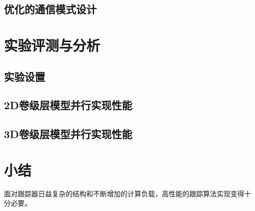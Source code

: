 \subsection{优化的通信模式设计}



\section{实验评测与分析}

\subsection{实验设置}

\subsection{2D卷级层模型并行实现性能}

\subsection{3D卷级层模型并行实现性能}


\section{小结}
面对跟踪器日益复杂的结构和不断增加的计算负载，高性能的跟踪算法实现变得十分必要。

